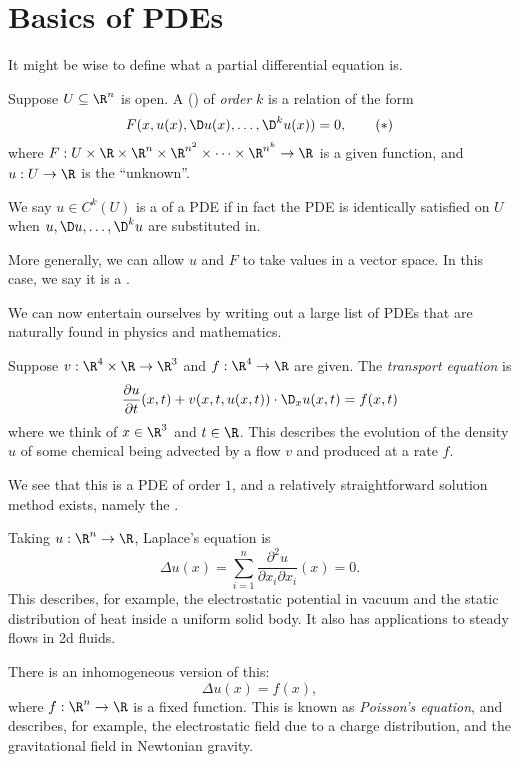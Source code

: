 \documentclass[a4paper]{article}
\begin{document}
\section{Basics of PDEs}
It might be wise to define what a partial differential equation is.

\begin{defi}
  Suppose $U \subseteq \R^n$ is open. A  () of \emph{order} $k$ is a relation of the form
  \[
    F(x, u(x), \D u(x), \ldots, \D^k u(x)) = 0,\tag{$*$}
  \]
  where $F: U \times \R \times \R^n \times \R^{n^2} \times \cdots \times \R^{n^k} \to \R$ is a given function, and $u: U \to \R$ is the ``unknown''.
\end{defi}

\begin{defi}
  We say $u \in C^k(U)$ is a  of a PDE if in fact the PDE is identically satisfied on $U$ when $u, \D u, \ldots, \D^k u$ are substituted in.
\end{defi}

More generally, we can allow $u$ and $F$ to take values in a vector space. In this case, we say it is a .

We can now entertain ourselves by writing out a large list of PDEs that are naturally found in physics and mathematics.
\begin{eg}
  Suppose $v: \R^4 \times \R \to \R^3$ and $f: \R^4 \to \R$ are given. The \emph{transport equation} is
  \[
    \frac{\partial u}{\partial t}(x, t) + v(x, t, u(x, t)) \cdot \D_x u(x, t) = f(x, t)
  \]
  where we think of $x \in \R^3$ and $t \in \R$. This describes the evolution of the density $u$ of some chemical being advected by a flow $v$ and produced at a rate $f$.

  We see that this is a PDE of order $1$, and a relatively straightforward solution method exists, namely the .
\end{eg}

\begin{eg}
  Taking $u: \R^n \to \R$, Laplace's equation is
  \[
    \Delta u(x) = \sum_{i = 1}^n \frac{\partial^2 u}{\partial x_i \partial x_i} (x) = 0.
  \]
  This describes, for example, the electrostatic potential in vacuum and the static distribution of heat inside a uniform solid body. It also has applications to steady flows in 2d fluids.

  There is an inhomogeneous version of this:
  \[
    \Delta u(x) = f(x),
  \]
  where $f: \R^n \to \R$ is a fixed function. This is known as \emph{Poisson's equation}, and describes, for example, the electrostatic field due to a charge distribution, and the gravitational field in Newtonian gravity.
\end{eg}
\end{document}
